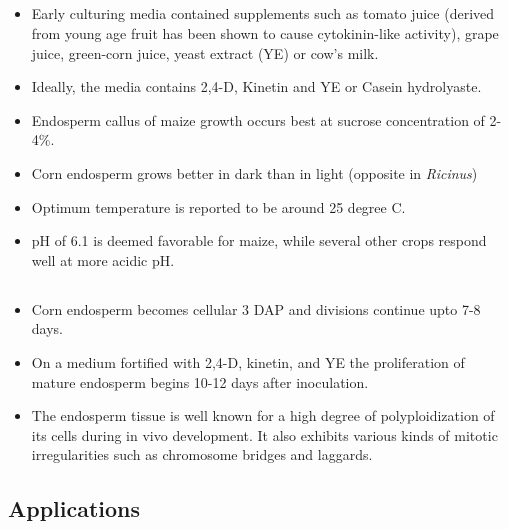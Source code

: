 \documentclass[
  ignorenonframetext,
  aspectratio=169]{beamer}
\providecommand{\tightlist}{%
  \setlength{\itemsep}{0pt}\setlength{\parskip}{0pt}}
\begin{document}
\hypertarget{section-5}{%
\subsection{}\label{section-5}}

\begin{frame}{}
\begin{itemize}
\tightlist
\item
  Early culturing media contained supplements such as tomato juice
  (derived from young age fruit has been shown to cause cytokinin-like
  activity), grape juice, green-corn juice, yeast extract (YE) or cow's
  milk.
\item
  Ideally, the media contains 2,4-D, Kinetin and YE or Casein
  hydrolyaste.
\item
  Endosperm callus of maize growth occurs best at sucrose concentration
  of 2-4\%.
\item
  Corn endosperm grows better in dark than in light (opposite in
  \emph{Ricinus})
\item
  Optimum temperature is reported to be around 25 degree C.
\item
  pH of 6.1 is deemed favorable for maize, while several other crops
  respond well at more acidic pH.
\end{itemize}
\end{frame}

\hypertarget{section-6}{%
\subsection{}\label{section-6}}

\begin{frame}{}
\begin{itemize}
\tightlist
\item
  Corn endosperm becomes cellular 3 DAP and divisions continue upto 7-8
  days.
\item
  On a medium fortified with 2,4-D, kinetin, and YE the proliferation of
  mature endosperm begins 10-12 days after inoculation.
\item
  The endosperm tissue is well known for a high degree of
  polyploidization of its cells during in vivo development. It also
  exhibits various kinds of mitotic irregularities such as chromosome
  bridges and laggards.
\end{itemize}
\end{frame}

\hypertarget{applications}{%
\subsection{Applications}\label{applications}}
\end{document}
